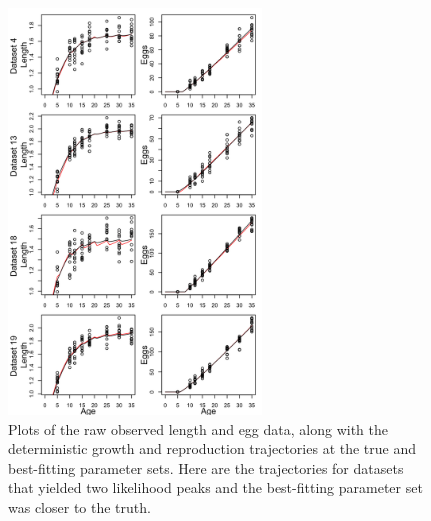 \documentclass[12pt,reqno,final,pdftex]{amsart}\usepackage[]{graphicx}\usepackage[]{color}
\newenvironment{knitrout}{}{} %
\theoremstyle{plain}
\numberwithin{equation}{part}
\begin{document}
\begin{knitrout}\scriptsize
{}\color{fgcolor}\begin{figure}

\includegraphics[width=0.6\textwidth]{figure/unnamed-chunk-6-1} \hfill{}

\caption[Plots of the raw observed length and egg data, along with the deterministic growth and reproduction trajectories at the true and best-fitting parameter sets]{Plots of the raw observed length and egg data, along with the deterministic growth and reproduction trajectories at the true and best-fitting parameter sets. Here are the trajectories for datasets that yielded two likelihood peaks and the best-fitting parameter set was closer to the truth.}\label{fig:unnamed-chunk-6}
\end{figure}


\end{knitrout}
\end{document}
